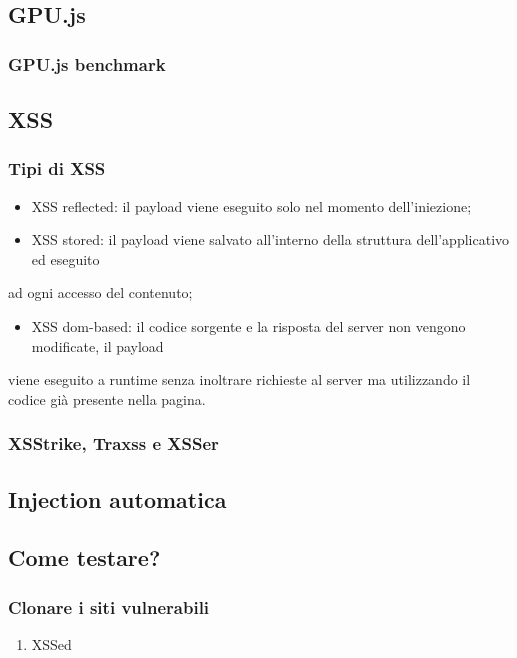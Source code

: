 \documentclass[11pt]{article}
\begin{document}
\subsection{GPU.js}
\label{sec:orgad27029}
\subsubsection{GPU.js benchmark}
\label{sec:org36630a8}
\subsection{XSS}
\label{sec:org10d825e}
\subsubsection{Tipi di XSS}
\label{sec:org175ca20}
\begin{itemize}
\item XSS reflected: il payload viene eseguito solo nel momento dell’iniezione;
\item XSS stored: il payload viene salvato all’interno della struttura dell’applicativo ed eseguito
\end{itemize}
ad ogni accesso del contenuto;
\begin{itemize}
\item XSS dom-based: il codice sorgente e la risposta del server non vengono modificate, il payload
\end{itemize}
viene eseguito a runtime senza inoltrare richieste al server ma utilizzando il codice già presente nella pagina.
\subsubsection{XSStrike, Traxss e XSSer}
\label{sec:org2bd1f52}
\subsection{Injection automatica}
\label{sec:orga249ac0}
\subsection{Come testare?}
\label{sec:orgfb26cd2}
\subsubsection{Clonare i siti vulnerabili}
\label{sec:orga8af3cf}
\begin{enumerate}
\item XSSed
\label{sec:org4e9dba9}
\end{enumerate}
\end{document}
